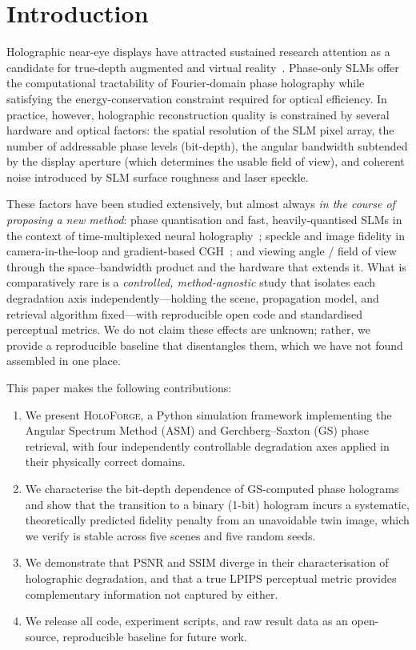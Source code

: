 \documentclass[conference]{IEEEtran}
\begin{document}
\section{Introduction}
Holographic near-eye displays have attracted sustained research attention as a
candidate for true-depth augmented and virtual reality~\cite{maimone2017holographic,
shi2021towards}. Phase-only SLMs offer the computational tractability of
Fourier-domain phase holography while satisfying the energy-conservation
constraint required for optical efficiency. In practice, however, holographic
reconstruction quality is constrained by several hardware and optical factors:
the spatial resolution of the SLM pixel array, the number of addressable phase
levels (bit-depth), the angular bandwidth subtended by the display aperture
(which determines the usable field of view), and coherent noise introduced by
SLM surface roughness and laser speckle.

These factors have been studied extensively, but almost always \emph{in the
course of proposing a new method}: phase quantisation and fast, heavily-quantised
SLMs in the context of time-multiplexed neural holography~\cite{choi2022time};
speckle and image fidelity in camera-in-the-loop and gradient-based
CGH~\cite{peng2020neural, chakravarthula2019wirtinger, shi2021towards}; and
viewing angle / field of view through the space--bandwidth product and the
hardware that extends it. What is comparatively rare is a \emph{controlled,
method-agnostic} study that isolates each degradation axis
independently---holding the scene, propagation model, and retrieval algorithm
fixed---with reproducible open code and standardised perceptual metrics. We do
not claim these effects are unknown; rather, we provide a reproducible baseline
that disentangles them, which we have not found assembled in one place.

This paper makes the following contributions:
\begin{enumerate}
  \item We present \textsc{HoloForge}, a Python simulation framework implementing
        the Angular Spectrum Method (ASM) and Gerchberg--Saxton (GS) phase
        retrieval, with four independently controllable degradation axes applied
        in their physically correct domains.
  \item We characterise the bit-depth dependence of GS-computed phase holograms
        and show that the transition to a binary (1-bit) hologram incurs a
        systematic, theoretically predicted fidelity penalty from an unavoidable
        twin image, which we verify is stable across five scenes and five
        random seeds.
  \item We demonstrate that PSNR and SSIM diverge in their characterisation of
        holographic degradation, and that a true LPIPS perceptual metric provides
        complementary information not captured by either.
  \item We release all code, experiment scripts, and raw result data as an
        open-source, reproducible baseline for future work.
\end{enumerate}
\end{document}
